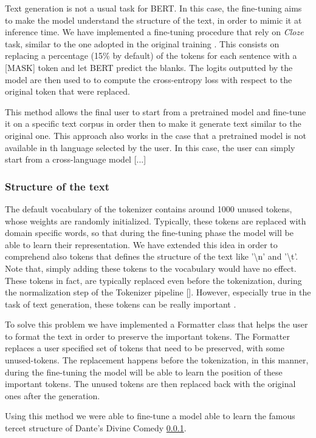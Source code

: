 \documentclass[10pt,twocolumn,letterpaper]{article}
\begin{document}
Text generation is not a usual task for BERT.
In this case, the fine-tuning aims to make the model understand the structure of the text,
in order to mimic it at inference time.
We have implemented a fine-tuning procedure that rely on \textit{Cloze} task, similar to the one adopted in the
 original training \cite{wang2019bert}.
This consists on replacing a percentage (15\% by default) of the tokens for each sentence with a [MASK] token and let
BERT predict the blanks. The logits outputted by the model are then used to to compute the cross-entropy
loss with respect to the original token that were replaced.

This method allows the final user to start from a pretrained model and fine-tune it on a specific
text corpus in order then to make it generate text similar to the original one.
This approach also works  in the case that a pretrained model is not available in th language selected by the user.
In this case, the user can simply start from a cross-language model [...]

\subsubsection{Structure of the text}
The default vocabulary of the tokenizer contains around 1000 unused tokens, whose weights are randomly initialized.
Typically, these tokens are replaced with domain specific words, so that during the fine-tuning phase
the model will be able to learn their representation.
We have extended this idea in order to comprehend also tokens that defines the structure of the text like
'\textbackslash n' and '\textbackslash t'.
Note that, simply adding these tokens to the vocabulary would have no effect.
These tokens in fact, are typically replaced even before the tokenization, during the normalization step of the Tokenizer pipeline [].
However, especially true in the task of text generation, these tokens can be really important .

To solve this problem we have implemented a Formatter class that helps the user to format the text in order
to preserve the important tokens.
The Formatter replaces a user specified set of tokens that need to be preserved, with some unused-tokens.
The replacement happens before the tokenization, in this manner, during the fine-tuning the model will be able to learn
the position of these important tokens.
The unused tokens are then replaced back with the original ones after the generation.

Using this method we were able to fine-tune a model able to learn the famous tercet structure of Dante's Divine Comedy \ref{}.
\end{document}
